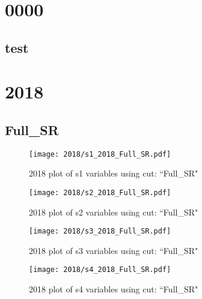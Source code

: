 \documentclass{article}
\begin{document}
    \graphicspath{ {../../plots/} }
    \listoffigures
    \section*{0000}
      \subsection*{test}
    \section*{2018}
      \subsection*{Full\_SR}
                        \begin{figure}[H]
                            \centering
                            \caption{2018 plot of s1 variables using cut: ``Full\_SR"}
                            \texttt{[image: 2018/s1\_2018\_Full\_SR.pdf]}
                        \end{figure}    
                        \begin{figure}[H]
                            \centering
                            \caption{2018 plot of s2 variables using cut: ``Full\_SR"}
                            \texttt{[image: 2018/s2\_2018\_Full\_SR.pdf]}
                        \end{figure}    
                        \begin{figure}[H]
                            \centering
                            \caption{2018 plot of s3 variables using cut: ``Full\_SR"}
                            \texttt{[image: 2018/s3\_2018\_Full\_SR.pdf]}
                        \end{figure}    
                        \begin{figure}[H]
                            \centering
                            \caption{2018 plot of s4 variables using cut: ``Full\_SR"}
                            \texttt{[image: 2018/s4\_2018\_Full\_SR.pdf]}
                        \end{figure}    
\end{document}
